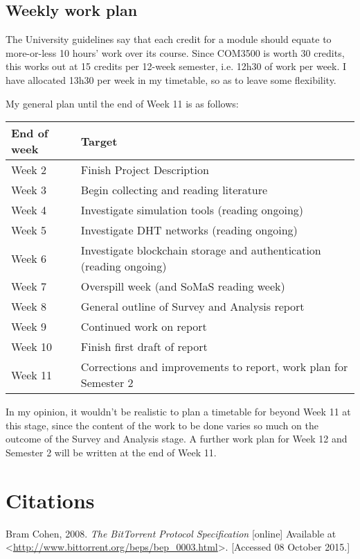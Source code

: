 \documentclass{article}
\begin{document}
\subsection{Weekly work plan}
The University guidelines say that each credit for a module should equate to more-or-less 10 hours' work over its course.  Since COM3500 is worth 30 credits, this works out at 15 credits per 12-week semester, i.e. 12h30 of work per week.  I have allocated 13h30 per week in my timetable, so as to leave some flexibility.

My general plan until the end of Week 11 is as follows:

\begin{table}[H]
  \centering
  \begin{tabular}{l l}
\textbf{End of week} & Target \\ \hline
Week 2               & Finish Project Description \\
Week 3               & Begin collecting and reading literature \\
Week 4               & Investigate simulation tools (reading ongoing) \\
Week 5               & Investigate DHT networks (reading ongoing) \\
Week 6               & Investigate blockchain storage and authentication (reading ongoing) \\
Week 7               & Overspill week (and SoMaS reading week) \\
Week 8               & General outline of Survey and Analysis report \\
Week 9               & Continued work on report \\
Week 10              & Finish first draft of report \\
Week 11              & Corrections and improvements to report, work plan for Semester 2 \\
  \end{tabular}
\end{table}

In my opinion, it wouldn't be realistic to plan a timetable for beyond Week 11 at this stage, since the content of the work to be done varies so much on the outcome of the Survey and Analysis stage.  A further work plan for Week 12 and Semester 2 will be written at the end of Week 11.

\section{Citations}
Bram Cohen, 2008.  \emph{The BitTorrent Protocol Specification} [online] Available at <\url{http://www.bittorrent.org/beps/bep_0003.html}>.  [Accessed 08 October 2015.]
\end{document}
